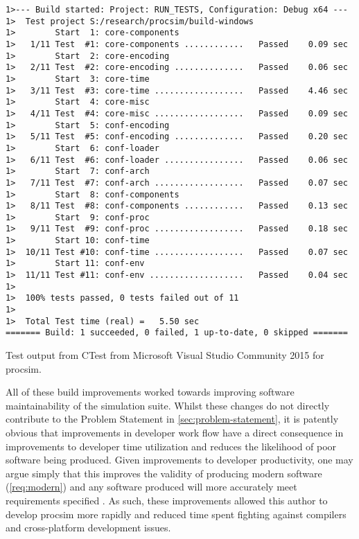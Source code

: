 \begin{listing}[hb!]
\begin{verbatim}
1>--- Build started: Project: RUN_TESTS, Configuration: Debug x64 ---
1>  Test project S:/research/procsim/build-windows
1>        Start  1: core-components
1>   1/11 Test  #1: core-components ............   Passed    0.09 sec
1>        Start  2: core-encoding
1>   2/11 Test  #2: core-encoding ..............   Passed    0.06 sec
1>        Start  3: core-time
1>   3/11 Test  #3: core-time ..................   Passed    4.46 sec
1>        Start  4: core-misc
1>   4/11 Test  #4: core-misc ..................   Passed    0.09 sec
1>        Start  5: conf-encoding
1>   5/11 Test  #5: conf-encoding ..............   Passed    0.20 sec
1>        Start  6: conf-loader
1>   6/11 Test  #6: conf-loader ................   Passed    0.06 sec
1>        Start  7: conf-arch
1>   7/11 Test  #7: conf-arch ..................   Passed    0.07 sec
1>        Start  8: conf-components
1>   8/11 Test  #8: conf-components ............   Passed    0.13 sec
1>        Start  9: conf-proc
1>   9/11 Test  #9: conf-proc ..................   Passed    0.18 sec
1>        Start 10: conf-time
1>  10/11 Test #10: conf-time ..................   Passed    0.07 sec
1>        Start 11: conf-env
1>  11/11 Test #11: conf-env ...................   Passed    0.04 sec
1>
1>  100% tests passed, 0 tests failed out of 11
1>
1>  Total Test time (real) =   5.50 sec
======= Build: 1 succeeded, 0 failed, 1 up-to-date, 0 skipped =======
\end{verbatim}
\caption{Test output from CTest \cite{CMake:CTest} from Microsoft Visual Studio Community 2015 for procsim.}
\label{lst:lua:ctest-output}
\end{listing}  

All of these build improvements worked towards improving software maintainability of the simulation suite. Whilst these changes do not directly contribute to the Problem Statement in \cref{sec:problem-statement}, it is patently obvious that improvements in developer work flow have a direct consequence in improvements to developer time utilization and reduces the likelihood of poor software being produced. Given improvements to developer productivity, one may argue simply that this improves the validity of producing modern software (\cref{req:modern}) and any software produced will more accurately meet requirements specified \cite{Solis2011}. As such, these improvements allowed this author to develop procsim more rapidly and reduced time spent fighting against compilers and cross-platform development issues.